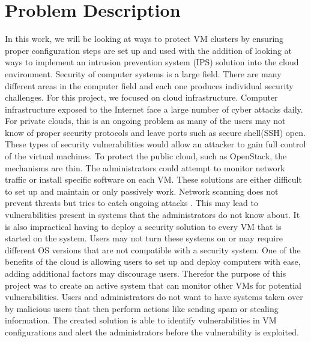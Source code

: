 \documentclass[12pt]{article}
\begin{document}
\section{Problem Description}
In this work, we will be looking at ways to protect VM clusters by ensuring proper configuration steps are set up and used with the addition of looking at ways to implement an intrusion prevention system (IPS) solution into the cloud environment. Security of computer systems is a large field. There are many different areas in the computer field and each one produces individual security challenges. For this project, we focused on cloud infrastructure. Computer infrastructure exposed to the Internet face a large number of cyber attacks daily\cite{cimpanu_2017}. For private clouds, this is an ongoing problem as many of the users may not know of proper security protocols and leave ports such as secure shell(SSH) open. These types of security vulnerabilities would allow an attacker to gain full control of the virtual machines. To protect the public cloud, such as OpenStack, the mechanisms are thin. The administrators could attempt to monitor network traffic or install specific software on each VM. These solutions are either difficult to set up and maintain or only passively work. Network scanning does not prevent threats but tries to catch ongoing attacks \cite{webster2006experience}. This may lead to vulnerabilities present in systems that the administrators do not know about. It is also impractical having to deploy a security solution to every VM that is started on the system. Users may not turn these systems on or may require different OS versions that are not compatible with a security system. One of the benefits of the cloud is allowing users to set up and deploy computers with ease, adding additional factors may discourage users. Therefor the purpose of this project was to create an active system that can monitor other VMs for potential vulnerabilities. Users and administrators do not want to have systems taken over by malicious users that then perform actions like sending spam or stealing information. The created solution is able to identify vulnerabilities in VM configurations and alert the administrators before the vulnerability is exploited.
\end{document}
